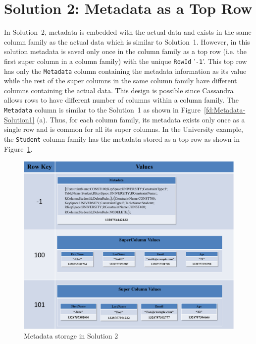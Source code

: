 
\section{Solution 2:  Metadata as a Top Row} \label{s:design-sol2}


In Solution~2,   metadata is embedded with the actual data and exists in the
same column family as the actual data which is similar to Solution~1. 
However,  in this solution   metadata is saved only once in the column family as
a top row (i.e. the first super column in a column family) with the unique
\texttt{RowId} '\texttt{-1}'.  This top row has only the \texttt{Metadata} 
column containing the metadata information as its value while the rest of the
super columns in the same column family have different columns containing the
actual data.  This design is possible since Cassandra allows rows to have
different number of columns within a column family.  The \texttt{Metadata}
column is similar to the Solution~1 as shown in Figure~\ref{fd:Metadata-Solution1} (a).  Thus,  for
each column family,  its metadata exists only once as a single row and is common
for all its super columns.  In the University example, the  \texttt{Student}
column family has the metadata  stored as a top row as  shown in
Figure~\ref{fd:Metadata-Solution2}.  
		 
	\begin{figure}[h]  
		\centering 
		\includegraphics[width=.8\textwidth]{./figure/Solutions/Sol2-MD-ColumnFamily.png}
		\caption{Metadata storage in Solution 2}\label{fd:Metadata-Solution2}
	\end{figure}
		
